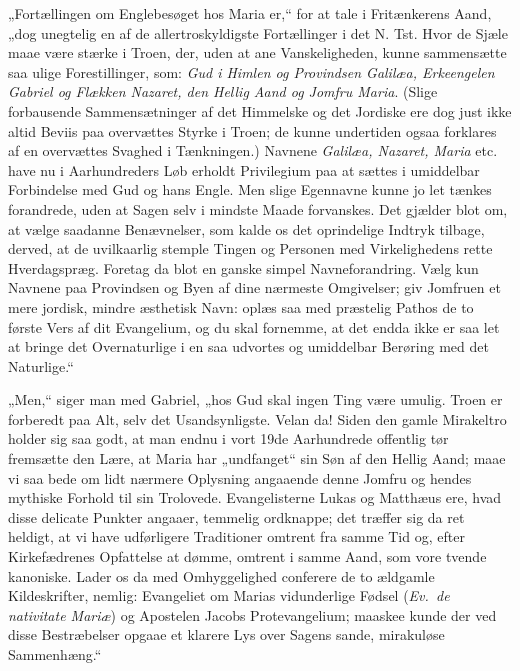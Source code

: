 \documentclass[12pt,a4paper]{book}
\begin{document}
„Fortællingen om Englebesøget hos Maria er,“ for at tale i Fritænkerens Aand,
„dog unegtelig en af de allertroskyldigste Fortællinger i det N. Tst. Hvor de
Sjæle maae være stærke i Troen, der, uden at ane Vanskeligheden, kunne
sammensætte saa ulige Forestillinger, som: \emph{Gud i Himlen og Provindsen
Galilæa, Erkeengelen Gabriel og Flækken Nazaret, den Hellig Aand og Jomfru
Maria}. (Slige forbausende Sammensætninger af det Himmelske og det Jordiske
ere dog just ikke altid Beviis paa overvættes Styrke i Troen; de kunne
undertiden ogsaa forklares af en overvættes Svaghed i Tænkningen.) Navnene
\emph{Galilæa, Nazaret, Maria} etc. have nu i Aarhundreders Løb erholdt
Privilegium paa at sættes i umiddelbar Forbindelse med Gud og hans Engle. Men
slige Egennavne kunne jo let tænkes forandrede, uden at Sagen selv i mindste
Maade forvanskes. Det gjælder blot om, at vælge saadanne Benævnelser, som
kalde os det oprindelige Indtryk tilbage, derved, at de uvilkaarlig stemple
Tingen og Personen med Virkelighedens rette Hverdagspræg. Foretag da blot en
ganske simpel Navneforandring. Vælg kun Navnene paa Provindsen og Byen af
dine nærmeste Omgivelser; giv Jomfruen et mere jordisk, mindre æsthetisk
Navn: oplæs saa med præstelig Pathos de to første Vers af dit Evangelium, og
du skal fornemme, at det endda ikke er saa let at bringe det Overnaturlige i
en saa udvortes og umiddelbar Berøring med det Naturlige.“

„Men,“ siger man med Gabriel, „hos Gud skal ingen Ting
være umulig. Troen er forberedt paa Alt, selv det Usandsynligste. Velan da!
Siden den gamle Mirakeltro holder sig saa godt, at man endnu i vort 19de
Aarhundrede offentlig tør fremsætte den Lære, at Maria har „undfanget“ sin
Søn af den Hellig Aand; maae vi saa bede om lidt nærmere Oplysning angaaende
denne Jomfru og hendes mythiske Forhold til sin Trolovede. Evangelisterne
Lukas og Matthæus ere, hvad disse delicate Punkter angaaer, temmelig
ordknappe; det træffer sig da ret heldigt, at vi have udførligere Traditioner
omtrent fra samme Tid og, efter Kirkefædrenes Opfattelse at dømme, omtrent i
samme Aand, som vore tvende kanoniske. Lader os da med Omhyggelighed
conferere de to ældgamle Kildeskrifter, nemlig: Evangeliet om Marias
vidunderlige Fødsel (\textit{Ev.\ de nativitate Mariæ}) og Apostelen Jacobs
Protevangelium; maaskee kunde der ved disse Bestræbelser opgaae et klarere
Lys over Sagens sande, mirakuløse Sammenhæng.“
\end{document}
